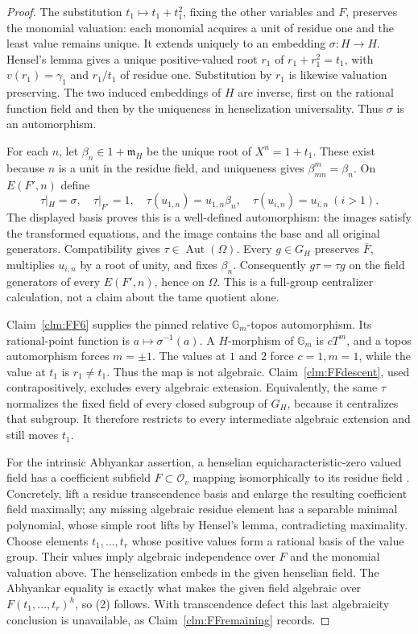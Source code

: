 \begin{proof}
The substitution \(t_1\mapsto t_1+t_1^2\), fixing the
other variables and \(F\), preserves the monomial
valuation: each monomial acquires a unit of residue one
and the least value remains unique. It extends uniquely
to an embedding \(\sigma:H\to H\). Hensel's lemma
gives a unique positive-valued root \(r_1\) of
\(r_1+r_1^2=t_1\), with \(v(r_1)=\gamma_1\) and
\(r_1/t_1\) of residue one. Substitution by \(r_1\)
is likewise valuation preserving. The two induced
embeddings of \(H\) are inverse, first on the rational
function field and then by the uniqueness in henselization
universality. Thus \(\sigma\) is an automorphism.

For each \(n\), let \(\beta_n\in1+\mathfrak m_H\)
be the unique root of \(X^n=1+t_1\). These exist because
\(n\) is a unit in the residue field, and uniqueness
gives \(\beta_{mn}^{m}=\beta_n\). On \(E(F',n)\)
define
\[
 \tau|_H=\sigma,\quad \tau|_{F'}=1,\quad
 \tau(u_{1,n})=u_{1,n}\beta_n,\quad
 \tau(u_{i,n})=u_{i,n}\ (i>1).
\]
The displayed basis proves this is a well-defined
automorphism: the images satisfy the transformed equations,
and the image contains the base and all original generators.
Compatibility gives \(\tau\in\operatorname{Aut}(\Omega)\).
Every \(g\in G_H\) preserves \(\bar F\), multiplies
\(u_{i,n}\) by a root of unity, and fixes \(\beta_n\).
Consequently \(g\tau=\tau g\) on the field generators
of every \(E(F',n)\), hence on \(\Omega\). This is a
full-group centralizer calculation, not a claim about
the tame quotient alone.

Claim~\ref{clm:FF6} supplies the pinned relative
\(\mathbb G_m\)-topos automorphism. Its rational-point
function is \(a\mapsto\sigma^{-1}(a)\). A
\(H\)-morphism of \(\mathbb G_m\) is \(cT^m\),
and a topos automorphism forces \(m=\pm1\). The values
at \(1\) and \(2\) force \(c=1,m=1\), while the
value at \(t_1\) is \(r_1\ne t_1\). Thus the map
is not algebraic. Claim~\ref{clm:FFdescent}, used
contrapositively, excludes every algebraic extension.
Equivalently, the same \(\tau\) normalizes the fixed field
of every closed subgroup of \(G_H\), because it centralizes
that subgroup. It therefore restricts to every intermediate
algebraic extension and still moves \(t_1\).

For the intrinsic Abhyankar assertion, a henselian
equicharacteristic-zero valued field has a coefficient
subfield \(F\subset\mathcal O_v\) mapping isomorphically
to its residue field \citep[Proposition~3.3.8]{FF_ADH2017}.
Concretely, lift a residue transcendence basis and enlarge
the resulting coefficient field maximally; any missing
algebraic residue element has a separable minimal polynomial,
whose simple root lifts by Hensel's lemma, contradicting
maximality. Choose elements \(t_1,\ldots,t_r\) whose
positive values form a rational basis of the value group.
Their values imply algebraic independence over \(F\)
and the monomial valuation above. The henselization
embeds in the given henselian field. The Abhyankar equality
is exactly what makes the given field algebraic over
\(F(t_1,\ldots,t_r)^h\), so (2) follows. With
transcendence defect this last algebraicity conclusion
is unavailable, as Claim~\ref{clm:FFremaining} records.


\end{proof}
